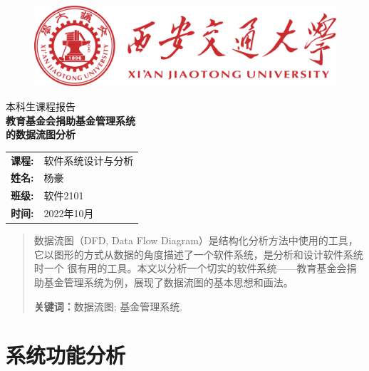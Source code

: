\documentclass[12pt, a4paper, oneside]{ctexart}
\begin{document}
\thispagestyle{empty}

\begin{figure}[t]
    \centering
    \includegraphics[width=13cm]{../pic/xjtu.png}
\end{figure}

\vspace*{\fill}
    \begin{center}
        \centering
        \vspace{-3cm}
        \fangsong\huge{本科生课程报告} \\\kaishu \Huge{\textbf{教育基金会捐助基金管理系统\\的数据流图分析}}
    \end{center}
\vspace*{\fill}

\begin{table}[b]
    \centering
    \large
    \begin{tabular}{ll}
        \textbf{课程:} & 软件系统设计与分析 \\
        \textbf{姓名:} & 杨豪 \\
        \textbf{班级:} & 软件2101 \\
        \textbf{时间:} & 2022年10月 \\
    \end{tabular}
\end{table}

\newpage

\thispagestyle{empty}
\begin{abstract}
    数据流图（DFD, Data Flow Diagram）是结构化分析方法中使用的工具，它以图形的方式从数据的角度描述了一个软件系统，是分析和设计软件系统时一个
    很有用的工具。本文以分析一个切实的软件系统——教育基金会捐助基金管理系统为例，展现了数据流图的基本思想和画法。
    \par\textbf{关键词：}数据流图; 基金管理系统. 
\end{abstract}

\newpage
{}
\setcounter{page}{1}
\thispagestyle{plain}
\tableofcontents
\newpage
\setcounter{page}{1}

\section{系统功能分析}
\end{document}
